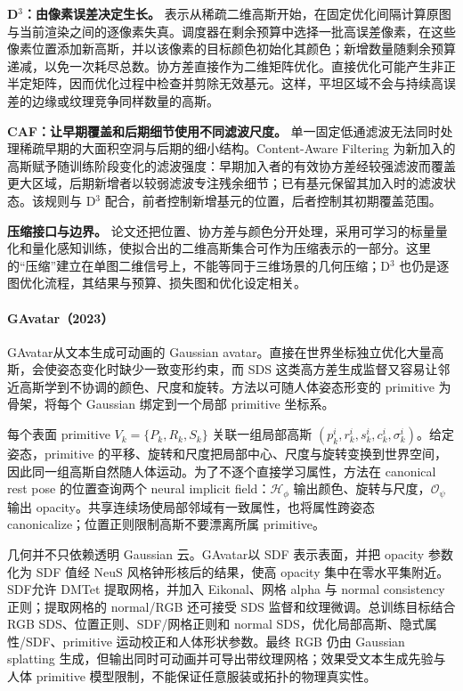 \textbf{D$^3$：由像素误差决定生长。} 表示从稀疏二维高斯开始，在固定优化间隔计算原图与当前渲染之间的逐像素失真。调度器在剩余预算中选择一批高误差像素，在这些像素位置添加新高斯，并以该像素的目标颜色初始化其颜色；新增数量随剩余预算递减，以免一次耗尽总数。协方差直接作为二维矩阵优化。直接优化可能产生非正半定矩阵，因而优化过程中检查并剪除无效基元。这样，平坦区域不会与持续高误差的边缘或纹理竞争同样数量的高斯。

\textbf{CAF：让早期覆盖和后期细节使用不同滤波尺度。} 单一固定低通滤波无法同时处理稀疏早期的大面积空洞与后期的细小结构。Content-Aware Filtering 为新加入的高斯赋予随训练阶段变化的滤波强度：早期加入者的有效协方差经较强滤波而覆盖更大区域，后期新增者以较弱滤波专注残余细节；已有基元保留其加入时的滤波状态。该规则与 D$^3$ 配合，前者控制新增基元的位置，后者控制其初期覆盖范围。

\textbf{压缩接口与边界。} 论文还把位置、协方差与颜色分开处理，采用可学习的标量量化和量化感知训练，使拟合出的二维高斯集合可作为压缩表示的一部分。这里的“压缩”建立在单图二维信号上，不能等同于三维场景的几何压缩；D$^3$ 也仍是逐图优化流程，其结果与预算、损失图和优化设定相关。

\paragraph{GAvatar（2023）\cite{2312_11461}}
GAvatar从文本生成可动画的 Gaussian avatar。直接在世界坐标独立优化大量高斯，会使姿态变化时缺少一致变形约束，而 SDS 这类高方差生成监督又容易让邻近高斯学到不协调的颜色、尺度和旋转。方法以可随人体姿态形变的 primitive 为骨架，将每个 Gaussian 绑定到一个局部 primitive 坐标系。

每个表面 primitive $V_k=\{P_k,R_k,S_k\}$ 关联一组局部高斯 $(p_k^i,r_k^i,s_k^i,c_k^i,\sigma_k^i)$。给定姿态，primitive 的平移、旋转和尺度把局部中心、尺度与旋转变换到世界空间，因此同一组高斯自然随人体运动。为了不逐个直接学习属性，方法在 canonical rest pose 的位置查询两个 neural implicit field：$\mathcal H_\phi$ 输出颜色、旋转与尺度，$\mathcal O_\psi$ 输出 opacity。共享连续场使局部邻域有一致属性，也将属性跨姿态 canonicalize；位置正则限制高斯不要漂离所属 primitive。

几何并不只依赖透明 Gaussian 云。GAvatar以 SDF 表示表面，并把 opacity 参数化为 SDF 值经 NeuS 风格钟形核后的结果，使高 opacity 集中在零水平集附近。SDF允许 DMTet 提取网格，并加入 Eikonal、网格 alpha 与 normal consistency 正则；提取网格的 normal/RGB 还可接受 SDS 监督和纹理微调。总训练目标结合 RGB SDS、位置正则、SDF/网格正则和 normal SDS，优化局部高斯、隐式属性/SDF、primitive 运动校正和人体形状参数。最终 RGB 仍由 Gaussian splatting 生成，但输出同时可动画并可导出带纹理网格；效果受文本生成先验与人体 primitive 模型限制，不能保证任意服装或拓扑的物理真实性。

